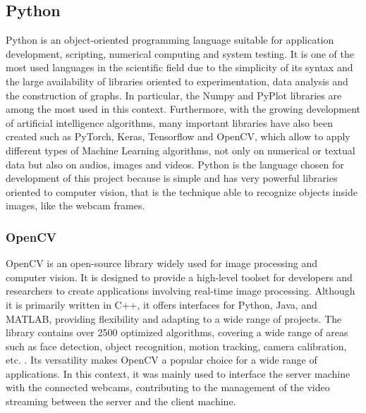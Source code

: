 \documentclass[a4paper,11pt]{report}
\theoremstyle{definition}
\theoremstyle{plain}
\begin{document}
        \subsection{Python}
            Python is an object-oriented programming language suitable for application development, scripting, numerical computing and system testing. It is one of the most used languages in the scientific field due to the simplicity of its syntax and the large availability of libraries oriented to experimentation, data analysis and the construction of graphs. In particular, the Numpy and PyPlot libraries are among the most used in this context. Furthermore, with the growing development of artificial intelligence algorithms, many important libraries have also been created such as PyTorch, Keras, Tensorflow and OpenCV, which allow to apply different types of Machine Learning algorithms, not only on numerical or textual data but also on audios, images and videos. \newline
            Python is the language chosen for development of this project because is simple and has very powerful libraries oriented to computer vision, that is the technique able to recognize objects inside images, like the webcam frames.
            \subsubsection{OpenCV}
                OpenCV is an open-source library widely used for image processing and computer vision. It is designed to provide a high-level toolset for developers and researchers to create applications involving real-time image processing. \newline
                Although it is primarily written in C++, it offers interfaces for Python, Java, and MATLAB, providing flexibility and adapting to a wide range of projects. The library contains over 2500 optimized algorithms, covering a wide range of areas such as face detection, object recognition, motion tracking, camera calibration, etc. . \newline
                Its versatility makes OpenCV a popular choice for a wide range of applications. In this context, it was mainly used to interface the server machine with the connected webcams, contributing to the management of the video streaming between the server and the client machine.
\end{document}
